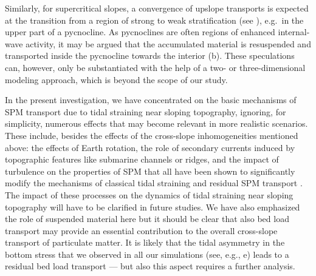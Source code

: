 Similarly, for supercritical slopes, a
convergence of upslope transports is expected at the transition from a
region of strong to weak stratification (see ), e.g.\ in
the upper part of a pycnocline. As pycnoclines are often regions of
enhanced internal-wave activity, it may be argued that the accumulated
material is resuspended and transported inside the pycnocline towards
the interior (b). These speculations can, however,
only be substantiated with the help of a two- or three-dimensional
modeling approach, which is beyond the scope of our study.

In the present investigation, we have concentrated on the basic
mechanisms of SPM transport due to tidal straining near sloping
topography, ignoring, for simplicity, numerous effects that may become
relevant in more realistic scenarios. These include, besides the
effects of the cross-slope inhomogeneities mentioned above: the effects
of Earth rotation, the role of secondary currents induced by
topographic features like submarine channels or ridges, and the impact
of turbulence on the properties of SPM that all have been shown to
significantly modify the mechanisms of classical tidal straining and
residual SPM transport
\citep[e.g.,][]{MacCreadyGeyer2010,Schulzetal2015a,ScullyFriedrichs2003a}. The
impact of these processes on the dynamics of tidal straining near
sloping topography will have to be clarified in future studies. We
have also emphasized the role of suspended material here but it should be
clear that also bed load transport \citep{vanRijn84a} may provide an
essential contribution to the overall cross-slope transport of
particulate matter. It is likely that the tidal asymmetry in the
bottom stress that we observed in all our simulations (see, e.g.,
e) leads to a residual bed load transport --- but
also this aspect requires a further analysis.
